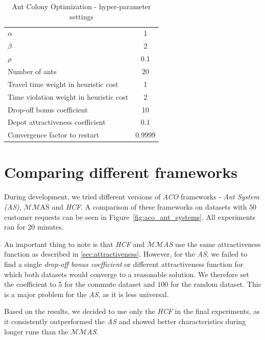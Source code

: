 \begin{table}[ht]
    \centering
    \begin{tabular}{lc}
        $\alpha$ & 1 \\
        $\beta$ & 2 \\
        $\rho$ & 0.1 \\
        Number of ants & 20 \\
        Travel time weight in heuristic cost & 1 \\
        Time violation weight in heuristic cost & 2 \\
        Drop-off bonus coefficient & 10 \\
        Depot attractiveness coefficient & 0.1 \\
        Convergence factor to restart & 0.9999
    \end{tabular}
    \caption{Ant Colony Optimization - hyper-parameter settings}
    \label{tab:aco_hyperparams}
\end{table}

\section{Comparing different frameworks}

During development, we tried different versions of \textit{ACO} frameworks - \textit{Ant System (AS)}\cite{Dorigo2010}, $\mathcal{MM}$AS\cite{STUTZLE2000889} and \textit{HCF}\cite{HCFMMAS}. A comparison of these frameworks on datasets with $50$ customer requests can be seen in Figure~\ref{fig:aco_ant_systems}. All experiments ran for 20 minutes.

An important thing to note is that \textit{HCF} and \textit{$\mathcal{MM}$AS} use the same attractiveness function as described in \ref{sec:attractiveness}. However, for the \textit{AS}, we failed to find a single \textit{drop-off bonus coefficient} or different attractiveness function for which both datasets would converge to a reasonable solution. We therefore set the coefficient to $5$ for the commute dataset and $100$ for the random dataset. This is a major problem for the \textit{AS}, as it is less universal.

Based on the results, we decided to use only the \textit{HCF} in the final experiments, as it consistently outperformed the \textit{AS} and showed better characteristics during longer runs than the \textit{$\mathcal{MM}$AS}.

